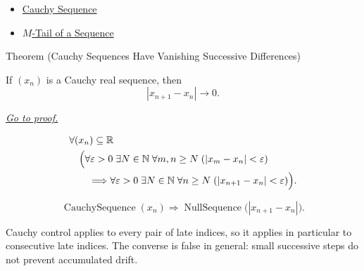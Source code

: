 \begin{dependencies}
\begin{itemize}
  \item \hyperref[def:cauchy-sequence]{Cauchy Sequence}
  \item \hyperref[def:m-tail]{$M$-Tail of a Sequence}
\end{itemize}
\end{dependencies}


\begin{theorembox}{Theorem (Cauchy Sequences Have Vanishing Successive Differences)}
\begin{theorem}
\label{thm:cauchy-successive-differences-vanish}
If $(x_n)$ is a Cauchy real sequence, then
\[
  |x_{n+1}-x_n|\to 0.
\]

\smallskip
\noindent
\hyperref[prf:cauchy-successive-differences-vanish]{\textit{Go to proof.}}
\end{theorem}
\end{theorembox}

\begin{remark*}
\[
\begin{aligned}
&\forall (x_n)\subseteq\mathbb{R}\\
&\quad
\Bigl(
  \forall \varepsilon>0\;\exists N\in\mathbb{N}\;\forall m,n\ge N
  \;( |x_m-x_n|<\varepsilon )\\
&\qquad\Longrightarrow
  \forall \varepsilon>0\;\exists N\in\mathbb{N}\;\forall n\ge N
  \;( |x_{n+1}-x_n|<\varepsilon )
\Bigr).
\end{aligned}
\]
\end{remark*}

\begin{remark*}
\[
\operatorname{CauchySequence}(x_n)
\Longrightarrow
\operatorname{NullSequence}\bigl(|x_{n+1}-x_n|\bigr).
\]
\end{remark*}

\begin{remark*}[Interpretation]
Cauchy control applies to every pair of late indices, so it applies in
particular to consecutive late indices. The converse is false in general:
small successive steps do not prevent accumulated drift.
\end{remark*}

